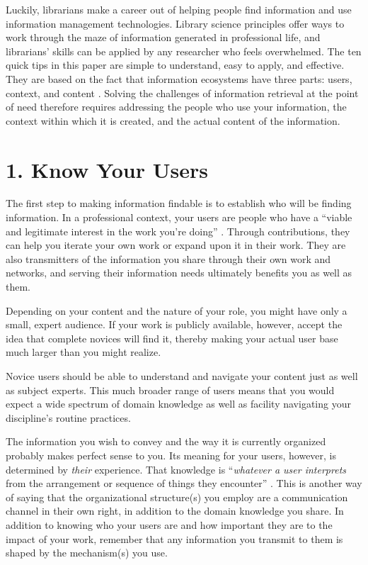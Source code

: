 \documentclass[10pt,letterpaper]{article}
\newcommand{\rulemajor}[1]{\section*{#1}}
\begin{document}
Luckily, librarians make a career out of helping people find information and use
information management technologies. Library science principles offer ways to
work through the maze of information generated in professional life, and
librarians' skills can be applied by any researcher who feels overwhelmed. The
ten quick tips in this paper are simple to understand, easy to apply, and
effective. They are based on the fact that information ecosystems have three
parts: users, context, and content \cite{Rosenfeld2015}. Solving the challenges
of information retrieval at the point of need therefore requires addressing the
people who use your information, the context within which it is created, and the
actual content of the information.

\rulemajor{1. Know Your Users}

The first step to making information findable is to establish who will be
finding information. In a professional context, your users are people who have a
``viable and legitimate interest in the work you're doing''
\cite{Covert2014}. Through contributions, they can help you iterate your own
work or expand upon it in their work. They are also transmitters of the
information you share through their own work and networks, and serving their
information needs ultimately benefits you as well as them.

Depending on your content and the nature of your role, you might have only a
small, expert audience. If your work is publicly available, however, accept the
idea that complete novices will find it, thereby making your actual user base
much larger than you might realize.

Novice users should be able to understand and navigate your content just as well
as subject experts. This much broader range of users means that you would expect
a wide spectrum of domain knowledge as well as facility navigating your
discipline's routine practices.

The information you wish to convey and the way it is currently organized
probably makes perfect sense to you. Its meaning for your users, however, is
determined by \emph{their} experience. That knowledge is ``\emph{whatever a user
  interprets} from the arrangement or sequence of things they encounter''
\cite{Covert2014}. This is another way of saying that the organizational
structure(s) you employ are a communication channel in their own right, in
addition to the domain knowledge you share. In addition to knowing who your
users are and how important they are to the impact of your work, remember that
any information you transmit to them is shaped by the mechanism(s) you use.
\end{document}
